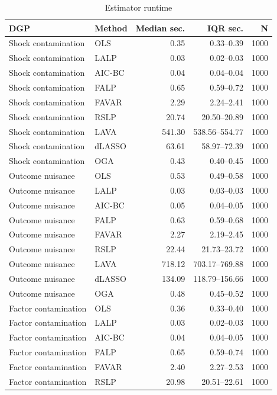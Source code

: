 \begin{table}[htb!]
\begin{center}
\caption{Estimator runtime}\label{tab:app_sim_runtime}
\begin{tabular}{llrrr}
\toprule
DGP & Method & Median sec. & IQR sec. & N \\
\midrule
Shock contamination & OLS & 0.35 & 0.33--0.39 & 1000 \\
Shock contamination & LALP & 0.03 & 0.02--0.03 & 1000 \\
Shock contamination & AIC-BC & 0.04 & 0.04--0.04 & 1000 \\
Shock contamination & FALP & 0.65 & 0.59--0.72 & 1000 \\
Shock contamination & FAVAR & 2.29 & 2.24--2.41 & 1000 \\
Shock contamination & RSLP & 20.74 & 20.50--20.89 & 1000 \\
Shock contamination & LAVA & 541.30 & 538.56--554.77 & 1000 \\
Shock contamination & dLASSO & 63.61 & 58.97--72.39 & 1000 \\
Shock contamination & OGA & 0.43 & 0.40--0.45 & 1000 \\
Outcome nuisance & OLS & 0.53 & 0.49--0.58 & 1000 \\
Outcome nuisance & LALP & 0.03 & 0.03--0.03 & 1000 \\
Outcome nuisance & AIC-BC & 0.05 & 0.04--0.05 & 1000 \\
Outcome nuisance & FALP & 0.63 & 0.59--0.68 & 1000 \\
Outcome nuisance & FAVAR & 2.27 & 2.19--2.45 & 1000 \\
Outcome nuisance & RSLP & 22.44 & 21.73--23.72 & 1000 \\
Outcome nuisance & LAVA & 718.12 & 703.17--769.88 & 1000 \\
Outcome nuisance & dLASSO & 134.09 & 118.79--156.66 & 1000 \\
Outcome nuisance & OGA & 0.48 & 0.45--0.52 & 1000 \\
Factor contamination & OLS & 0.36 & 0.33--0.40 & 1000 \\
Factor contamination & LALP & 0.03 & 0.02--0.03 & 1000 \\
Factor contamination & AIC-BC & 0.04 & 0.04--0.05 & 1000 \\
Factor contamination & FALP & 0.65 & 0.59--0.74 & 1000 \\
Factor contamination & FAVAR & 2.40 & 2.27--2.53 & 1000 \\
Factor contamination & RSLP & 20.98 & 20.51--22.61 & 1000 \\

\end{tabular}
\end{center}
\end{table}
